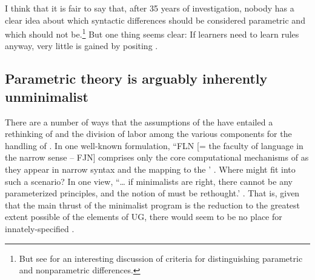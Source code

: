 \documentclass[output=paper,
modfonts
]{LSP/langsci}
\begin{document}
I think that it is fair to say that, after 35 years of investigation,
nobody has a clear idea about which syntactic differences should be
considered parametric and which should not be.\footnote{But see \citet{smith2009n} for an interesting discussion of criteria for
  distinguishing parametric and nonparametric differences.} But one
thing seems clear: If learners need to learn rules anyway, very little
is gained by positing .

\subsection{Parametric theory is arguably inherently unminimalist}

There are a number of ways that the assumptions of the  have entailed
a rethinking of  and the division of labor among the various
components for the handling of . In one well-known formulation,
``FLN {[}= the faculty of language in the narrow sense  --  FJN{]}
comprises only the core computational mechanisms of  as they
appear in narrow syntax and the mapping to the ' \citep[1573]{hauser2002}. Where might  fit into such a
scenario? In one view, ``\ldots{} if minimalists are right, there cannot
be any parameterized principles, and the notion of 
must be rethought.' \citep[206]{boeckx2011}. That is, given that the main
thrust of the minimalist program is the reduction to the greatest extent
possible of the elements of UG, there would seem to be no place for
innately-specified .
\end{document}
